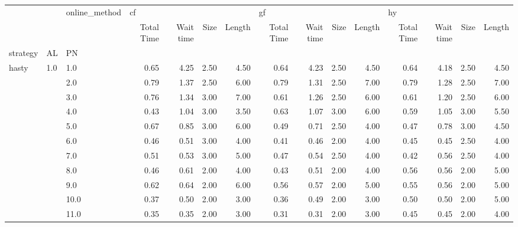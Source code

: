\begin{tabular}{lllrrrrrrrrrrrr}
\toprule
       &     & online\_method & \multicolumn{4}{l}{cf} & \multicolumn{4}{l}{gf} & \multicolumn{4}{l}{hy} \\
       &     & {} & Total Time & Wait time & Size & Length & Total Time & Wait time & Size & Length & Total Time & Wait time & Size & Length \\
strategy & AL & PN &            &           &      &        &            &           &      &        &            &           &      &        \\
\midrule
hasty & 1.0 & 1.0  &       0.65 &      4.25 & 2.50 &   4.50 &       0.64 &      4.23 & 2.50 &   4.50 &       0.64 &      4.18 & 2.50 &   4.50 \\
       &     & 2.0  &       0.79 &      1.37 & 2.50 &   6.00 &       0.79 &      1.31 & 2.50 &   7.00 &       0.79 &      1.28 & 2.50 &   7.00 \\
       &     & 3.0  &       0.76 &      1.34 & 3.00 &   7.00 &       0.61 &      1.26 & 2.50 &   6.00 &       0.61 &      1.20 & 2.50 &   6.00 \\
       &     & 4.0  &       0.43 &      1.04 & 3.00 &   3.50 &       0.63 &      1.07 & 3.00 &   6.00 &       0.59 &      1.05 & 3.00 &   5.50 \\
       &     & 5.0  &       0.67 &      0.85 & 3.00 &   6.00 &       0.49 &      0.71 & 2.50 &   4.00 &       0.47 &      0.78 & 3.00 &   4.50 \\
       &     & 6.0  &       0.46 &      0.51 & 3.00 &   4.00 &       0.41 &      0.46 & 2.00 &   4.00 &       0.45 &      0.45 & 2.50 &   4.00 \\
       &     & 7.0  &       0.51 &      0.53 & 3.00 &   5.00 &       0.47 &      0.54 & 2.50 &   4.00 &       0.42 &      0.56 & 2.50 &   4.00 \\
       &     & 8.0  &       0.46 &      0.61 & 2.00 &   4.00 &       0.43 &      0.51 & 2.00 &   4.00 &       0.56 &      0.56 & 2.00 &   5.00 \\
       &     & 9.0  &       0.62 &      0.64 & 2.00 &   6.00 &       0.56 &      0.57 & 2.00 &   5.00 &       0.55 &      0.56 & 2.00 &   5.00 \\
       &     & 10.0 &       0.37 &      0.50 & 2.00 &   3.00 &       0.36 &      0.49 & 2.00 &   3.00 &       0.50 &      0.50 & 2.00 &   5.00 \\
       &     & 11.0 &       0.35 &      0.35 & 2.00 &   3.00 &       0.31 &      0.31 & 2.00 &   3.00 &       0.45 &      0.45 & 2.00 &   4.00 \\

\end{tabular}
